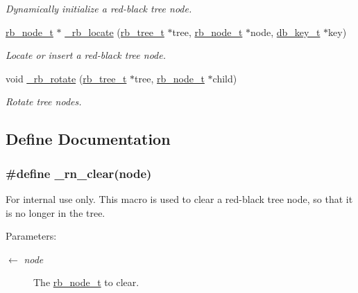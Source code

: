 \begin{CompactItemize}
\begin{CompactList}\small\item\em Dynamically initialize a red-black tree node. \item\end{CompactList}\item 
\hyperlink{struct__rb__node__s}{rb\_\-node\_\-t} $\ast$ \hyperlink{group__dbprim__rbtree_ga15}{\_\-rb\_\-locate} (\hyperlink{struct__rb__tree__s}{rb\_\-tree\_\-t} $\ast$tree, \hyperlink{struct__rb__node__s}{rb\_\-node\_\-t} $\ast$node, \hyperlink{struct__db__key__s}{db\_\-key\_\-t} $\ast$key)
\begin{CompactList}\small\item\em Locate or insert a red-black tree node. \item\end{CompactList}\item 
void \hyperlink{group__dbprim__rbtree_ga16}{\_\-rb\_\-rotate} (\hyperlink{struct__rb__tree__s}{rb\_\-tree\_\-t} $\ast$tree, \hyperlink{struct__rb__node__s}{rb\_\-node\_\-t} $\ast$child)
\begin{CompactList}\small\item\em Rotate tree nodes. \item\end{CompactList}\end{CompactItemize}


\subsection{Define Documentation}
\hypertarget{group__dbprim__rbtree_ga46}{
\subsubsection[\_\-rn\_\-clear]{\setlength{\rightskip}{0pt plus 5cm}\#define \_\-rn\_\-clear(node)}}
\label{group__dbprim__rbtree_ga46}


\begin{Desc}
\item[For internal use only.]
This macro is used to clear a red-black tree node, so that it is no longer in the tree.

\begin{Desc}
\item[Parameters:]
\begin{description}
\item[\mbox{$\leftarrow$} {\em node}]The \hyperlink{group__dbprim__rbtree_ga1}{rb\_\-node\_\-t} to clear.\end{description}
\end{Desc}
\end{Desc}


